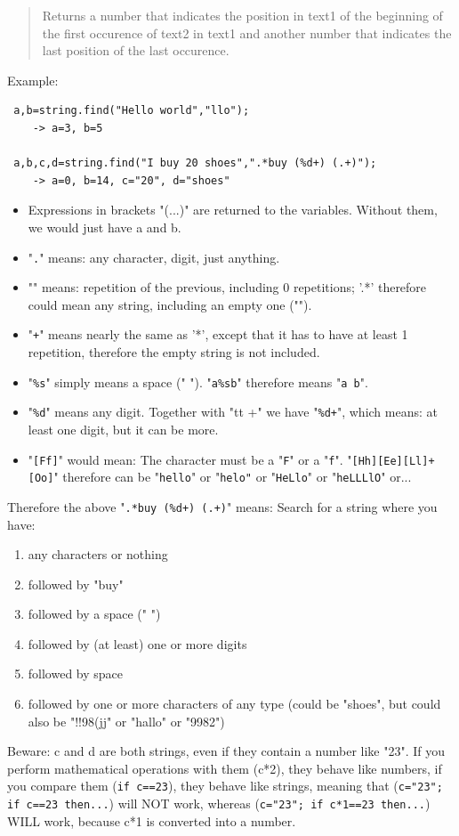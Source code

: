 \documentclass[a4paper,10pt,makeidx]{scrreprt}
\newcommand{\comm}[1]{\index{#1}\texttt{#1}}
\begin{document}
\begin{quote}
       Returns a number that indicates the position in text1 of the beginning of the first occurence of text2 in text1 and another number that indicates the last position of the last occurence.
\end{quote}
Example:
\begin{verbatim}
 a,b=string.find("Hello world","llo");
    -> a=3, b=5

 a,b,c,d=string.find("I buy 20 shoes",".*buy (%d+) (.+)");
    -> a=0, b=14, c="20", d="shoes"
\end{verbatim}
\begin{itemize}
\item Expressions in brackets "(...)" are returned to the variables. Without them, we would just have a and b.
\item "{\tt .}" means: any character, digit, just anything.
\item "{\tt *}" means: repetition of the previous, including 0 repetitions; '.*' therefore could mean any string, including an empty one ("").
\item "{\tt +}" means nearly the same as '*', except that it has to have at least 1 repetition, therefore the empty string is not included.
\item "{\tt \%s}" simply means a space (" "). "{\tt a\%sb}" therefore means "{\tt a b}".
\item "{\tt \%d}" means any digit. Together with "{tt +}" we have "{\tt \%d+}", which means: at least one digit, but it can be more.
\item "{\tt [Ff]}" would mean: The character must be a "{\tt F}" or a "{\tt f}". "{\tt [Hh][Ee][Ll]+[Oo]}" therefore can be "{\tt hello}" or "{\tt helo"} or "{\tt HeLlo}" or "{\tt heLLLlO}" or...
\end{itemize}
Therefore the above "{\tt .*buy (\%d+) (.+)}" means:
Search for a string where you have:
\begin{enumerate}
\item any characters or nothing
\item followed by "buy"
\item followed by a space (" ")
\item followed by (at least) one or more digits
\item followed by space
\item followed by one or more characters of any type (could be "shoes", but could also be "!!98(jj" or "hallo" or "9982")
\end{enumerate}
Beware: c and d are both strings, even if they contain a number like "23". If you perform mathematical operations with them (c*2), they behave like numbers, if you compare them (\comm{if c==23}), they behave like strings, meaning that ({\tt c="23"; if c==23 then...}) will NOT work, whereas ({\tt c="23"; if c*1==23 then...}) WILL work, because c*1 is converted into a number.
\end{document}
